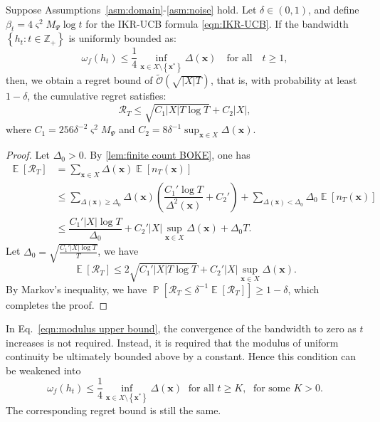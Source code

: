 \documentclass[11pt,en]{elegantpaper}
\newcommand{\x}{\bm{x}}
\newcommand{\order}{\mathcal{O}}
\newcommand{\cumregret}{\mathcal{R}}
\newcommand{\1}{\mathds{1}}
\newcommand{\set}[1]{\left\{#1\right\}}
\DeclareMathOperator*{\E}{\mathbb{E}}
\DeclareMathOperator*{\Prob}{\mathbb{P}}
\begin{document}
\begin{theorem}
    \label{thm:finite regret BOKE}
    Suppose Assumptions~\ref{asm:domain}-\ref{asm:noise} hold. Let $\delta \in (0, 1)$, and define $\beta_t = 4 \varsigma^2 M_{\Psi} \log t$ for the IKR-UCB formula \eqref{eqn:IKR-UCB}.
    If the bandwidth $\set{h_t : t \in \mathbb{Z}_+}$ is uniformly bounded as:
    \begin{equation}
        \label{eqn:modulus upper bound}
        \omega_f(h_t)
        \le \dfrac{1}{4} \inf_{\x \in X \setminus \set{\x^{\ast}}} \Delta(\x)
        \quad \text{for all} \quad t \ge 1,
    \end{equation}
    then, we obtain a regret bound of $\widetilde{\order}(\sqrt{|X| T})$, that is, with probability at least $1 - \delta$, the cumulative regret satisfies:
    \begin{equation}
        \cumregret_T \le \sqrt{C_1 |X| T \log T} + C_2 |X|,
    \end{equation}
    where $C_1 ={ 256 \delta^{-2} \varsigma^2 M_{\Psi}}$ and $C_2 = 8 \delta^{-1} \sup_{\x \in X} \Delta(\x)$.
\end{theorem}

\begin{proof}
    Let $\Delta_0 > 0$. By \cref{lem:finite count BOKE}, one has
    \begin{align*}
        \E[\cumregret_T]
        & = \sum_{\x \in X} \Delta(\x) \E[n_T(\x)] 
        \\
        & \le \sum_{\Delta(\x) \ge \Delta_0} \Delta(\x) \left( \dfrac{C_1' \log T}{\Delta^2(\x)} + C_2' \right) + \sum_{\Delta(\x) < \Delta_0} \Delta_0 \E[n_T(\x)] 
        \\
        & \le \dfrac{C_1' |X| \log T}{\Delta_0} + C_2' |X| \sup_{\x \in X} \Delta(\x) + \Delta_0 T.
    \end{align*}
    Let $\Delta_0 = \sqrt{\frac{C_1' |X| \log T}{T}}$, we have
    \[
        \E[\cumregret_T] \le 2 \sqrt{C_1' |X| T \log T} + C_2' |X| \sup_{\x \in X} \Delta(\x).
    \]
    By Markov's inequality, we have $\Prob \left[ \cumregret_T \le \delta^{-1} \E[\cumregret_T] \right] \ge 1 - \delta$, which completes the proof.
\end{proof}

\begin{remark}
    In Eq.~\eqref{eqn:modulus upper bound}, the convergence of the bandwidth to zero as $t$ increases is not required. Instead, it is required that the modulus of uniform continuity be ultimately bounded above by a constant.
    Hence this condition can be weakened into
    \[
        \omega_f(h_t)
        \le \dfrac{1}{4} \inf_{\x \in X \setminus \set{\x^{\ast}}} \Delta(\x) \;\text{ for all } t \ge K, \; \text{ for some } K > 0.
    \]
    The corresponding regret bound is still the same.
\end{remark}
\end{document}
